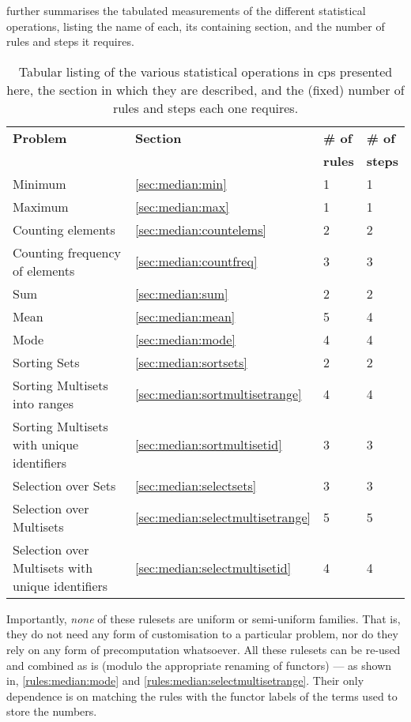  further summarises the tabulated measurements of the different statistical operations, listing the name of each, its containing section, and the number of rules and steps it requires.

\begin{table}[htbp] \centering
   \begin{tabular}{|l|l|l|l|}
    \hline
    \textbf{Problem} & \textbf{Section} & \textbf{\# of} & \textbf{\# of}\\&& \textbf{rules} & \textbf{steps}\\ \hline
    Minimum & \ref{sec:median:min} & 1 & 1 \\ %
    Maximum & \ref{sec:median:max} & 1 & 1 \\ \hline
    Counting elements & \ref{sec:median:countelems} & 2 & 2 \\ %
    Counting frequency of elements & \ref{sec:median:countfreq} & 3 & 3 \\ \hline
    Sum & \ref{sec:median:sum} & 2 & 2 \\ %
    Mean & \ref{sec:median:mean} & 5 & 4 \\ %
    Mode & \ref{sec:median:mode} & 4 & 4 \\ \hline
    Sorting Sets & \ref{sec:median:sortsets} & 2 & 2 \\ %
    Sorting Multisets into ranges & \ref{sec:median:sortmultisetrange} & 4 & 4 \\ %
    Sorting Multisets with unique identifiers & \ref{sec:median:sortmultisetid} & 3 & 3 \\ \hline
    Selection over Sets & \ref{sec:median:selectsets} & 3 & 3 \\ %
    Selection over Multisets & \ref{sec:median:selectmultisetrange} & 5 & 5 \\ %
    Selection over Multisets with unique identifiers & \ref{sec:median:selectmultisetid} & 4 & 4 \\ \hline
\end{tabular} 
\caption[Listing of various statistical operations in \gls{cps}]{\label{tab:median:summary}Tabular listing of the various statistical operations in \gls{cps} presented here, the section in which they are described, and the (fixed) number of rules and steps each one requires.}
\end{table}

Importantly, \emph{none} of these \glspl{ruleset} are uniform or semi-uniform families.  That is, they do not need any form of customisation to a particular problem, nor do they rely on any form of precomputation whatsoever.  All these \glspl{ruleset} can be re-used and combined as is (modulo the appropriate renaming of \glspl{functor}) --- as shown in, \eg{} \cref{rules:median:mode} and \cref{rules:median:selectmultisetrange}.  Their only dependence is on matching the rules with the \gls{functor} labels of the terms used to store the numbers.

